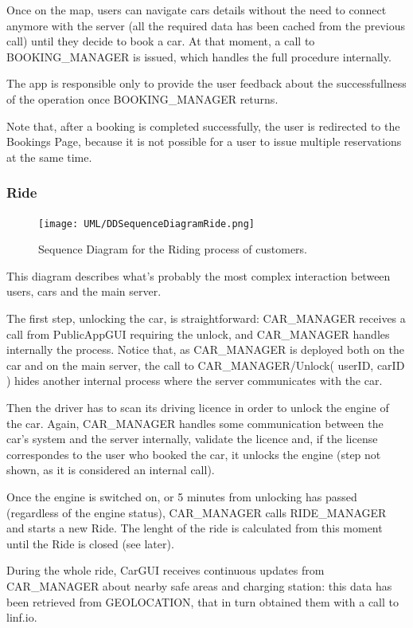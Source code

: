\documentclass[11pt]{article} %
\begin{document}
Once on the map, users can navigate cars details without the need to connect anymore with the server (all the required data has been cached from the previous call) until they decide to book a car. At that moment, a call to BOOKING\_MANAGER is issued, which handles the full procedure internally.

The app is responsible only to provide the user feedback about the successfullness of the operation once BOOKING\_MANAGER returns.

Note that, after a booking is completed successfully, the user is redirected to the Bookings Page, because it is not possible for a user to issue multiple reservations at the same time.


\subsubsection{Ride}
\begin{figure}[H]
	\centering
	\texttt{[image: UML/DDSequenceDiagramRide.png]}
	\caption{Sequence Diagram for the Riding process of customers.}
\end{figure}

This diagram describes what's probably the most complex interaction between users, cars and the main server.

The first step, unlocking the car, is straightforward: CAR\_MANAGER receives a call from PublicAppGUI requiring the unlock, and CAR\_MANAGER handles internally the process. Notice that, as CAR\_MANAGER is deployed both on the car and on the main server, the call to CAR\_MANAGER/Unlock( userID, carID ) hides another internal process where the server communicates with the car.

Then the driver has to scan its driving licence in order to unlock the engine of the car. Again, CAR\_MANAGER handles some communication between the car's system and the server internally, validate the licence and, if the license correspondes to the user who booked the car, it unlocks the engine (step not shown, as it is considered an internal call).

Once the engine is switched on, or 5 minutes from unlocking has passed (regardless of the engine status), CAR\_MANAGER calls RIDE\_MANAGER and starts a new Ride. The lenght of the ride is calculated from this moment until the Ride is closed (see later).

During the whole ride, CarGUI receives continuous updates from CAR\_MANAGER about nearby safe areas and charging station: this data has been retrieved from GEOLOCATION, that in turn obtained them with a call to linf.io.
\end{document}
